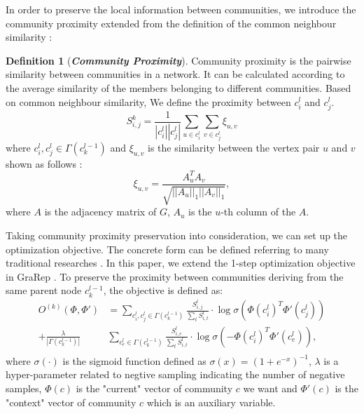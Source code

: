 \documentclass{article}
\theoremstyle{definition}
\newtheorem{defn}{Definition}
\begin{document}
	    
	    In order to preserve the local information between communities, we introduce the community proximity extended from the definition of the common neighbour similarity \cite{libennowell2007the}:
		\begin{defn}[\textbf{\emph{Community Proximity}}]
			Community proximity is the pairwise similarity between communities in a network. It can be calculated according to the average similarity of the members belonging to different communities. Based on common neighbour similarity, We define the proximity between $c^l_i$ and $c^l_j$.
			\begin{equation}
			S_{i,j}^k = \frac{1}{|c_i^l||c_j^l|}\sum_{u \in c_i^l} \sum_{v \in c_j^l} \xi_{u, v}
			\end{equation} 
			where $c_i^l, c_j^l \in \Gamma(c_k^{l-1})$
			and $\xi_{u, v}$ is the similarity between the vertex pair $u$ and $v$ shown as follows :
			\begin{equation}
			\xi_{u,v} = \frac{A_u^TA_v}{\sqrt{||A_u||_1||A_v||_1}},
			\end{equation}
			where $A$ is the adjacency matrix of $G$, $A_u$ is the $u$-th column of the $A$.
			
		\end{defn}
		Taking community proximity preservation into consideration, we can set up the optimization objective. The concrete form can be defined referring to many traditional researches \cite{Tang2015LINE} \cite{mikolov2013efficient}. In this paper, we extend the 1-step optimization objective in GraRep \cite{Cao2015GraRep}. To preserve the proximity between communities deriving from the same parent node $c_k^{l-1}$, the objective is defined as: 
		\begin{equation}
		\label{equ:local_loss} 
		\begin{split}
		O^{(k)}(\Phi, \Phi') & = \sum_{c_i^l, c_j^l \in \Gamma(c_k^{l-1})} \frac{S_{i,j}^l}{\sum_t S_{i, t}^l} \cdot \log{\sigma(\Phi(c_i^l)^T \Phi'(c_j^l))} \\
		+ \frac{\lambda}{|\Gamma(c_k^{l-1})|}&\sum_{c_e^l \in \Gamma(c_k^{l-1})} \frac{S_{i, e}^l}{\sum_t S_{i, t}^l} \cdot \log{\sigma(-\Phi(c_i^l)^T \Phi'(c_e^l))}, \\
		\end{split}
		\end{equation}
		where $\sigma(\cdot)$ is the sigmoid function defined as $\sigma(x) = (1+e^{-x})^{-1}$, $\lambda$ is a hyper-parameter related to negtive sampling indicating the number of negative samples, $\Phi(c)$ is the "current" vector \cite{Cao2015GraRep} of community $c$ we want and $\Phi'(c)$ is the "context" vector \cite{Cao2015GraRep} of community $c$ which is an auxiliary variable.  
\end{document}

